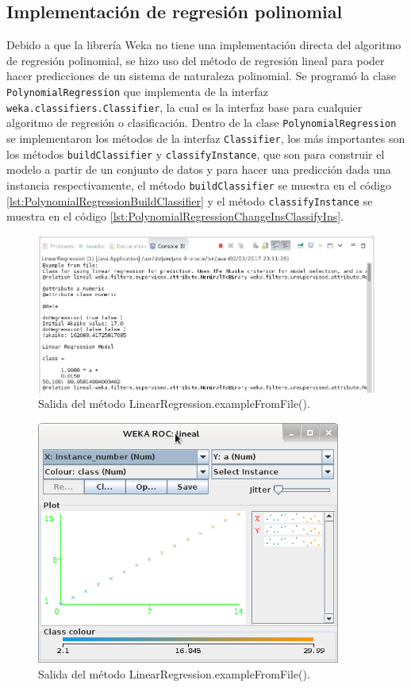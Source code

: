 \subsection{Implementación de regresión polinomial} \label{subsec:implementacionRegresionPolinomial}
Debido a que la librería Weka no tiene una implementación directa del algoritmo de regresión polinomial, se hizo uso del método de regresión lineal para poder hacer predicciones de un sistema de naturaleza polinomial. 
Se programó la clase \texttt{PolynomialRegression} que implementa de la interfaz \texttt{weka.classifiers.Classifier}, la cual es la interfaz base para cualquier algoritmo de regresión o clasificación.
Dentro de la clase \texttt{PolynomialRegression} se implementaron los métodos de la interfaz \texttt{Classifier}, los más importantes son los métodos \texttt{buildClassifier} y \texttt{classifyInstance}, que son para construir el modelo a partir de un conjunto de datos y para hacer una predicción dada una instancia respectivamente, 
el método \texttt{buildClassifier} se muestra en el código \ref{lst:PolynomialRegressionBuildClassifier} 
y el método \texttt{classifyInstance} se muestra en el código \ref{lst:PolynomialRegressionChangeInsClassifyIns}.

\begin{figure}[h]
	\centering
	\includegraphics[width=16cm]{img/salidaMetodoLinearRegression.png}
	\caption{Salida del método LinearRegression.exampleFromFile().}
	\label{fig:salidaMetodoLinearRegression}
\end{figure}
\clearpage
\begin{figure}[h]
	\centering
	\includegraphics[width=10cm]{img/representacionGraficaDatosLinearR.png}
	\caption{Salida del método LinearRegression.exampleFromFile().}
	\label{fig:representacionGraficaDatosLinearR}
\end{figure}


